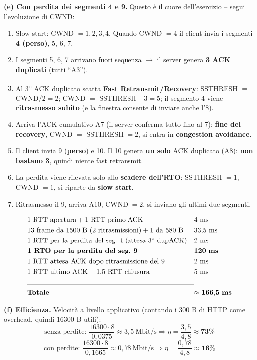 \documentclass[12pt, a4paper]{article}
\begin{document}
\begin{tcolorbox}[colback=orange!5, colframe=orange!70!black, title=\textbf{Esercizio B.4 (esame 16 giugno 2015, soluzione ufficiale)}]
\textbf{(e) Con perdita dei segmenti 4 e 9.} Questo è il cuore dell'esercizio -- segui l'evoluzione di CWND:
\begin{enumerate}
    \item Slow start: CWND $= 1, 2, 3, 4$. Quando CWND $=4$ il client invia i segmenti \textbf{4 (perso)}, 5, 6, 7.
    \item I segmenti 5, 6, 7 arrivano fuori sequenza $\to$ il server genera \textbf{3 ACK duplicati} (tutti ``A3'').
    \item Al 3\textsuperscript{o} ACK duplicato scatta \textbf{Fast Retransmit/Recovery}: SSTHRESH $=$ CWND$/2 = 2$; CWND $=$ SSTHRESH $+3 = 5$; il segmento 4 viene \textbf{ritrasmesso subito} (e la finestra consente di inviare anche l'8).
    \item Arriva l'ACK cumulativo A7 (il server conferma tutto fino al 7): \textbf{fine del recovery}, CWND $=$ SSTHRESH $= 2$, si entra in \textbf{congestion avoidance}.
    \item Il client invia 9 (\textbf{perso}) e 10. Il 10 genera \textbf{un solo} ACK duplicato (A8): \textcolor{red!70!black}{\textbf{non bastano 3}}, quindi niente fast retransmit.
    \item La perdita viene rilevata solo allo \textbf{scadere dell'RTO}: SSTHRESH $=1$, CWND $=1$, si riparte da \textbf{slow start}.
    \item Ritrasmesso il 9, arriva A10, CWND $=2$, si inviano gli ultimi due segmenti.
\end{enumerate}
\begin{align*}
&\text{1 RTT apertura} + \text{1 RTT primo ACK} && 4\ \text{ms}\\
&\text{13 frame da 1500 B (2 ritrasmissioni)} + \text{1 da 580 B} && 33{,}5\ \text{ms}\\
&\text{1 RTT per la perdita del seg.\ 4 (attesa 3\textsuperscript{o} dupACK)} && 2\ \text{ms}\\
&\textbf{1 RTO per la perdita del seg.\ 9} && \mathbf{120\ ms}\\
&\text{1 RTT attesa ACK dopo ritrasmissione del 9} && 2\ \text{ms}\\
&\text{1 RTT ultimo ACK} + \text{1,5 RTT chiusura} && 5\ \text{ms}\\
\cline{1-3}
&\textbf{Totale} && \mathbf{\approx 166{,}5\ ms}
\end{align*}

\textbf{(f) Efficienza.} Velocità a livello applicativo (contando i 300 B di HTTP come overhead, quindi 16300 B utili):
$$\text{senza perdite: } \frac{16300\cdot 8}{0{,}0375} \approx 3{,}5\ \text{Mbit/s} \Rightarrow \eta = \frac{3{,}5}{4{,}8} \approx \mathbf{73\%}$$
$$\text{con perdite: } \frac{16300\cdot 8}{0{,}1665} \approx 0{,}78\ \text{Mbit/s} \Rightarrow \eta = \frac{0{,}78}{4{,}8} \approx \mathbf{16\%}$$


\end{tcolorbox}
\end{document}
